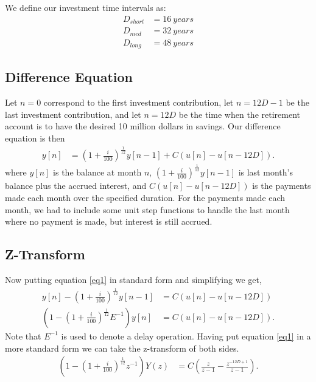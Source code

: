 \documentclass[letterpaper]{article}
\begin{document}
We define our investment time intervals as:
\begin{align}
	D_{short} &= \SI{16}{years}  \\
	D_{med}   &= \SI{32}{years}  \\
	D_{long}  &= \SI{48}{years}
\end{align}

\pagebreak
\subsection{Difference Equation}
Let $n=0$ correspond to the first investment contribution, let $n = 12D -1$ be the last investment contribution, and let $n = 12D$ be the time when the retirement account is to have the desired 10 million dollars in savings. Our difference equation is then
\begin{align}
	y[n] &= \left(1 + \frac{i}{100} \right)^{\frac{1}{12}} y[n-1] + C (u[n] - u[n-12D]). \label{eq1}
\end{align}
where $y[n]$ is the balance at month $n$, $\left(1 + \frac{i}{100} \right)^{\frac{1}{12}} y[n-1]$ is last month's balance plus the accrued interest, and $C(u[n] - u[n-12D])$ is the payments made each month over the specified duration. For the payments made each month, we had to include some unit step functions to handle the last month where no payment is made, but interest is still accrued.

\subsection{Z-Transform}

Now putting equation \ref{eq1} in standard form and simplifying we get,
\begin{align}
	y[n] - \left(1 + \frac{i}{100} \right)^{\frac{1}{12}} y[n-1] &= C (u[n] - u[n-12D]) \\
	\left(1 - \left(1 + \frac{i}{100} \right)^{\frac{1}{12}}E^{-1}\right)y[n] &= C (u[n] - u[n-12D]). \label{eq2}
\end{align}
Note that $E^{-1}$ is used to denote a delay operation. Having put equation \ref{eq1} in a more standard form we can take the z-transform of both sides.
\begin{align}
	\left(1 - \left(1 + \frac{i}{100} \right)^{\frac{1}{12}}z^{-1}\right)Y(z) &= C \left(\frac{z}{z-1} - \frac{z^{-12D+1}}{z-1} \right).
\end{align}
\end{document}
